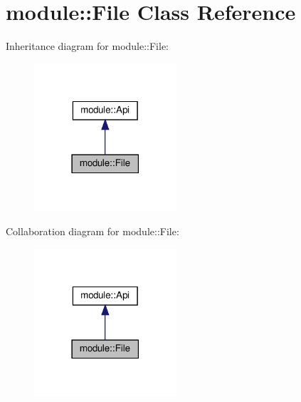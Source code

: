 \hypertarget{classmodule_1_1File}{}\section{module\+:\+:File Class Reference}
\label{classmodule_1_1File}


Inheritance diagram for module\+:\+:File\+:
\nopagebreak
\begin{figure}[H]
\begin{center}
\leavevmode
\includegraphics[width=150pt]{classmodule_1_1File__inherit__graph}
\end{center}
\end{figure}


Collaboration diagram for module\+:\+:File\+:
\nopagebreak
\begin{figure}[H]
\begin{center}
\leavevmode
\includegraphics[width=150pt]{classmodule_1_1File__coll__graph}
\end{center}
\end{figure}
